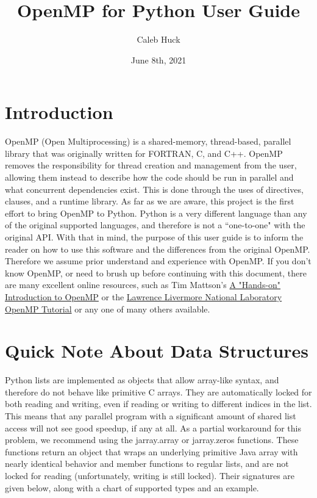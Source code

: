 \documentclass[letterpaper,12pt]{article} %
\begin{document}
\title{\Large{\textbf{OpenMP for Python User Guide}}}
\author{Caleb Huck}
\date{June 8th, 2021}
\maketitle

\section{Introduction}
OpenMP (Open Multiprocessing) is a shared-memory, thread-based, parallel library that was originally written for FORTRAN, C, and C++. OpenMP removes the responsibility for thread creation and management from the user, allowing them instead to describe how the code should be run in parallel and what concurrent dependencies exist. This is done through the uses of directives, clauses, and a runtime library. As far as we are aware, this project is the first effort to bring OpenMP to Python. Python is a very different language than any of the original supported languages, and therefore is not a ``one-to-one" with the original API. With that in mind, the purpose of this user guide is to inform the reader on how to use this software and the differences from the original OpenMP. Therefore we assume prior understand and experience with OpenMP. If you don't know OpenMP, or need to brush up before continuing with this document, there are many excellent online resources, such as Tim Mattson's \href{https://youtu.be/pRtTIW9-Nr0}{A "Hands-on" Introduction to OpenMP} or the \href{https://hpc.llnl.gov/training/tutorials/openmp-tutorial}{Lawrence Livermore National Laboratory OpenMP Tutorial} or any one of many others available.

\section{Quick Note About Data Structures}
Python lists are implemented as objects that allow array-like syntax, and therefore do not behave like primitive C arrays. They are automatically locked for both reading and writing, even if reading or writing to different indices in the list. This means that any parallel program with a significant amount of shared list access will not see good speedup, if any at all. As a partial workaround for this problem, we recommend using the jarray.array or jarray.zeros functions. These functions return an object that wraps an underlying primitive Java array with nearly identical behavior and member functions to regular lists, and are not locked for reading (unfortunately, writing is still locked). Their signatures are given below, along with a chart of supported types and an example. 
\end{document}
